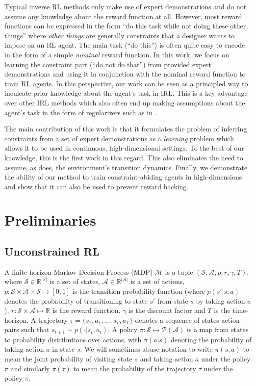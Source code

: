 \documentclass{article}
\begin{document}
Typical inverse RL methods only make use of expert demonstrations and do not assume any knowledge about the reward function at all. However, most reward functions can be expressed in the form ``{do this task while not doing these other things}'' where \textit{other things} are generally constraints that a designer wants to impose on an RL agent. The main task (``do this'') is often quite easy to encode in the form of a simple \textit{nominal} reward function. In this work, we focus on learning the constraint part (``do not do that'') from provided expert demonstrations and using it in conjunction with the nominal reward function to train RL agents. In this perspective, our work can be seen as a principled way to inculcate prior knowledge about the agent's task in IRL. This is a key advantage over other IRL methods which also often end up making assumptions about the agent's task in the form of regularizers such as in \citet{finn2016gcl}.

The main contribution of this work is that it formulates the problem of inferring constraints from a set of expert demonstrations as a \textit{learning} problem which allows it to be used in continuous, high-dimensional settings. To the best of our knowledge, this is the first work in this regard. This also eliminates the need to assume, as \citet{scobee2020maximum} does, the environment's transition dynamics. Finally, we demonstrate the ability of our method to train constraint-abiding agents in high-dimensions and show that it can also be used to prevent reward hacking.

\section{Preliminaries}
\subsection{Unconstrained RL}
A finite-horizon Markov Decision Process (MDP) $\mathcal{M}$ is a tuple $(\mathcal{S}, \mathcal{A}, p, r, \gamma, T)$, where $\mathcal{S} \in \mathbb{R}^{\vert\mathcal{S}\vert}$ is a set of states, $\mathcal{A}\in \mathbb{R}^{\vert\mathcal{A}\vert}$ is a set of actions, $p:\mathcal{S}\times\mathcal{A}\times\mathcal{S} \mapsto [0,1]$ is the transition probability function (where $p(s'\vert s,a)$ denotes the probability of transitioning to state $s'$ from state $s$ by taking action $a$), $r:\mathcal{S} \times \mathcal{A} \mapsto \mathbb{R}$ is the reward function, $\gamma$ is the discount factor and $T$ is the time-horizon. A trajectory $\tau=\{s_1,a_1,\ldots,s_T,a_T\}$ denotes a sequence of states-action pairs such that $s_{t+1} \sim p(\cdot \vert s_t,a_t)$. A policy $\pi : \mathcal{S} \mapsto \mathcal{P}(\mathcal{A})$ is a map from states to probability distributions over actions, with $\pi(a\vert s)$ denoting the probability of taking action $a$ in state $s$. We will sometimes abuse notation to write $\pi(s,a)$ to mean the joint probability of visiting state $s$ and taking action $a$ under the policy $\pi$ and similarly $\pi(\tau)$ to mean the probability of the trajectory $\tau$ under the policy $\pi$.
\end{document}
